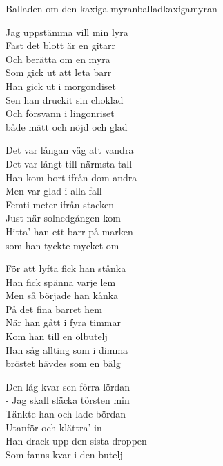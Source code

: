 \begin{song}{Balladen om den kaxiga myran}{balladkaxigamyran}
\begin{vers}
Jag uppstämma vill min lyra\\
Fast det blott är en gitarr\\
Och berätta om en myra\\
Som gick ut att leta barr\\
Han gick ut i morgondiset\\
Sen han druckit sin choklad\\
Och försvann i lingonriset\\
\repopen både mätt och nöjd och glad \repclose\\
\end{vers}
\begin{vers}
Det var långan väg att vandra\\
Det var långt till närmsta tall\\
Han kom bort ifrån dom andra\\
Men var glad i alla fall\\
Femti meter ifrån stacken\\
Just när solnedgången kom\\
Hitta' han ett barr på marken\\
\repopen som han tyckte mycket om \repclose\\
\end{vers}
\begin{vers}
För att lyfta fick han stånka\\
Han fick spänna varje lem\\
Men så började han kånka\\
På det fina barret hem\\
När han gått i fyra timmar\\
Kom han till en ölbutelj\\
Han såg allting som i dimma\\
\repopen bröstet hävdes som en bälg \repclose\\
\end{vers}
\begin{vers}
Den låg kvar sen förra lördan\\
- Jag skall släcka törsten min\\
Tänkte han och lade bördan\\
Utanför och klättra' in\\
Han drack upp den sista droppen\\
Som fanns kvar i den butelj\\

\end{vers}
\end{song}
